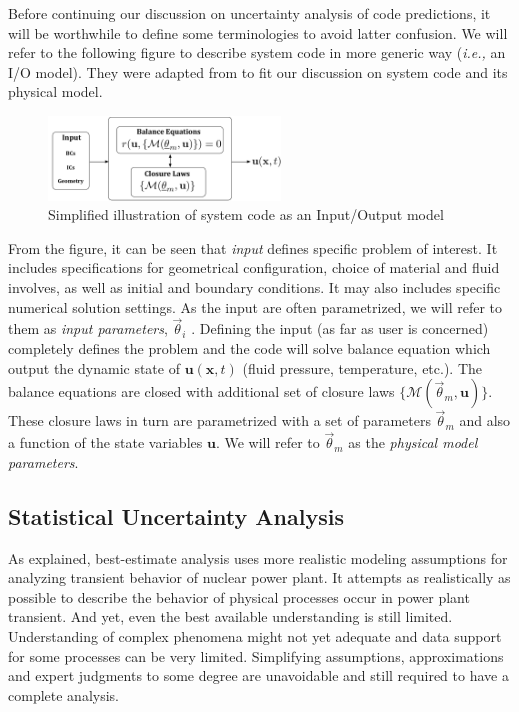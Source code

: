 \documentclass[11pt,titlepage]{article}
\begin{document}
Before continuing our discussion on uncertainty analysis of code predictions, it will be worthwhile to define some terminologies to avoid latter confusion.
We will refer to the following figure to describe system code in more generic way (\emph{i.e.,} an I/O model).
They were adapted from \cite{Cheung2011} to fit our discussion on system code and its physical model.
\begin{figure}[htbp]
	\centering
	\includegraphics[width=0.55\textwidth]{Model.pdf}
	\caption{Simplified illustration of system code as an Input/Output model}
	\label{fig:Model}
\end{figure}

From the figure, it can be seen that \emph{input} defines specific problem of interest.
It includes specifications for geometrical configuration, choice of material and fluid involves, as well as initial and boundary conditions.
It may also includes specific numerical solution settings.
As the input are often parametrized, we will refer to them as \emph{input parameters}, $\vec{\theta}_i$ . 
Defining the input (as far as user is concerned) completely defines the problem and the code will solve balance equation which output the dynamic state of $\mathbf{u}(\mathbf{x}, t)$ (fluid pressure, temperature, etc.). 
The balance equations are closed with additional set of closure laws $\{\mathcal{M}(\vec{\theta}_m, \mathbf{u})\}$.
These closure laws in turn are parametrized with a set of parameters $\vec{\theta}_m$ and also a function of the state variables $\mathbf{u}$. 
We will refer to $\vec{\theta}_m$ as the \emph{physical model parameters}.

\subsection{Statistical Uncertainty Analysis} 

As explained, best-estimate analysis uses more realistic modeling assumptions for analyzing transient behavior of nuclear power plant.
It attempts as realistically as possible to describe the behavior of physical processes occur in power plant transient.
And yet, even the best available understanding is still limited. 
Understanding of complex phenomena might not yet adequate and data support for some processes can be very limited.
Simplifying assumptions, approximations and expert judgments to some degree are unavoidable and still required to have a complete analysis. 
\end{document}
